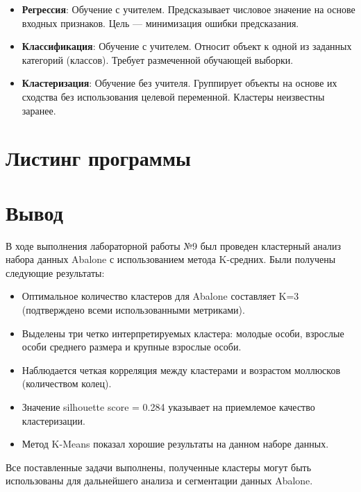 \begin{itemize}
    \item \textbf{Регрессия}: Обучение с учителем. Предсказывает числовое значение на основе входных признаков. Цель — минимизация ошибки предсказания.
    
    \item \textbf{Классификация}: Обучение с учителем. Относит объект к одной из заданных категорий (классов). Требует размеченной обучающей выборки.
    
    \item \textbf{Кластеризация}: Обучение без учителя. Группирует объекты на основе их сходства без использования целевой переменной. Кластеры неизвестны заранее.
\end{itemize}

\section{Листинг программы}



\section*{Вывод}

В ходе выполнения лабораторной работы №9 был проведен кластерный анализ набора данных Abalone с использованием метода K-средних. Были получены следующие результаты:

\begin{itemize}
    \item Оптимальное количество кластеров для Abalone составляет K=3 (подтверждено всеми использованными метриками).
    \item Выделены три четко интерпретируемых кластера: молодые особи, взрослые особи среднего размера и крупные взрослые особи.
    \item Наблюдается четкая корреляция между кластерами и возрастом моллюсков (количеством колец).
    \item Значение silhouette score = 0.284 указывает на приемлемое качество кластеризации.
    \item Метод K-Means показал хорошие результаты на данном наборе данных.
\end{itemize}

Все поставленные задачи выполнены, полученные кластеры могут быть использованы для дальнейшего анализа и сегментации данных Abalone.

\endinput